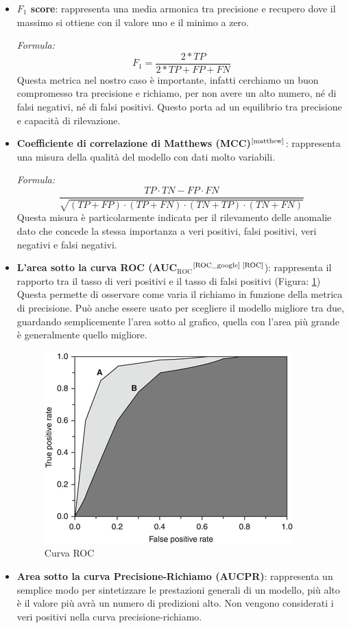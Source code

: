 \begin{itemize}
    \item \textbf{$F_1$ score}: rappresenta una media armonica tra precisione e recupero dove il massimo si ottiene con il valore uno e il minimo a zero.

    \textit{Formula:}
    \begin{equation}
        F_1=\frac{2*TP}{2*TP+FP+FN}
    \end{equation}
    Questa metrica nel nostro caso è importante, infatti cerchiamo un buon compromesso tra precisione e richiamo, per non avere un alto numero, né di falsi negativi, né di falsi positivi. Questo porta ad un equilibrio tra precisione e capacità di rilevazione.

    \item \textbf{Coefficiente di correlazione di Matthews (MCC)}$^{\text{\cite{matthew}}}$: rappresenta una misura della qualità del modello con dati molto variabili.

    \textit{Formula:}
    \begin{equation}
        \frac{TP\cdot TN-FP\cdot FN}{\sqrt{(TP+FP)\cdot (TP+FN)\cdot(TN+TP)\cdot(TN+FN)}}    
    \end{equation}
    Questa misura è particolarmente indicata per il rilevamento delle anomalie dato che concede la stessa importanza a veri positivi, falsi positivi, veri negativi e falsi negativi.

    \item \textbf{L'area sotto la curva ROC (AUC$_\text{ROC}$}$^{\text{\cite{ROC_google}}}$$^{\text{\cite{ROC}}}$): rappresenta il rapporto tra il tasso di veri positivi e il tasso di falsi positivi (Figura: \ref{fig:Curva ROC})
    Questa permette di osservare come varia il richiamo in funzione della metrica di precisione. Può anche essere usato per scegliere il modello migliore tra due, guardando semplicemente l'area sotto al grafico, quella con l'area più grande è generalmente quello migliore.

    \begin{figure}
        \centering
        \includegraphics[width=0.5\linewidth]{images//Capitolo3/Curva ROC.png}
        \caption{Curva ROC}
        \label{fig:Curva ROC}
    \end{figure}
    
    \item \textbf{Area sotto la curva Precisione-Richiamo (AUC\textunderscore PR)}: rappresenta un semplice modo per sintetizzare le prestazioni generali di un modello, più alto è il valore più avrà un numero di predizioni alto. Non vengono considerati i veri positivi nella curva precisione-richiamo.
\end{itemize}
